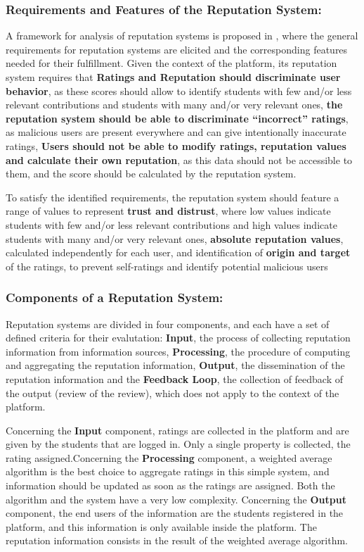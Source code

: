 \documentclass[conference]{IEEEtran}
\begin{document}
\subsubsection{Requirements and Features of the Reputation System:}

A framework for analysis of reputation systems is proposed in \cite{vavilis2014reference}, where the general requirements for reputation systems are elicited and the corresponding features needed for their fulfillment. Given the context of the platform, its reputation system requires that \textbf{Ratings and Reputation should discriminate user behavior}, as these scores should allow to identify students with few and/or less relevant contributions and students with many and/or very relevant ones, \textbf{the reputation system should be able to discriminate ``incorrect'' ratings}, as malicious users are present everywhere and can give intentionally inaccurate ratings, \textbf{Users should not be able to modify ratings, reputation values and calculate their own reputation}, as this data should not be accessible to them, and the score should be calculated by the reputation system.

To satisfy the identified requirements, the reputation system should feature a range of values to represent \textbf{trust and distrust}, where low values indicate students with few and/or less relevant contributions and high values indicate students with many and/or very relevant ones, \textbf{absolute reputation values}, calculated independently for each user, and identification of \textbf{origin and target} of the ratings, to prevent self-ratings and identify potential malicious users

\subsubsection{Components of a Reputation System:}
Reputation systems are divided in four components\cite{liu2012systematic,liu2010evaluation}, and each have a set of defined criteria for their evalutation: \textbf{Input}, the process of collecting reputation information from information sources, \textbf{Processing}, the procedure of computing and aggregating the reputation information, \textbf{Output}, the dissemination of the reputation information and the \textbf{Feedback Loop}, the collection of feedback of the output (review of the review), which does not apply to the context of the platform.

Concerning the \textbf{Input} component, ratings are collected in the platform and are given by the students that are logged in. Only a single property is collected, the rating assigned.Concerning the \textbf{Processing} component, a weighted average algorithm is the best choice to aggregate ratings in this simple system, and information should be updated as soon as the ratings are assigned. Both the algorithm and the system have a very low complexity. Concerning the \textbf{Output} component, the end users of the information are the students registered in the platform, and this information is only available inside the platform. The reputation information consists in the result of the weighted average algorithm.
\end{document}
